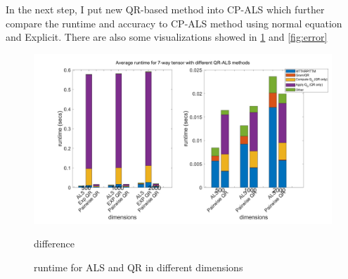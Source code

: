 \documentclass{article}
\begin{document}
In the next step, I put new QR-based method into CP-ALS which further compare the runtime and accuracy to 
CP-ALS method using normal equation and Explicit. There are also some visualizations showed in \cref{fig:runtime} and \cref{fig:error}
\begin{figure}[ht!]
  \begin{center}
    
    \includegraphics[scale = 0.25]{7runtime.jpg}
    
    \caption[Figure]{runtime for ALS and QR in different dimensions \label{fig:runtime}}
  \end{center}
difference 
\end{figure}
\end{document}
